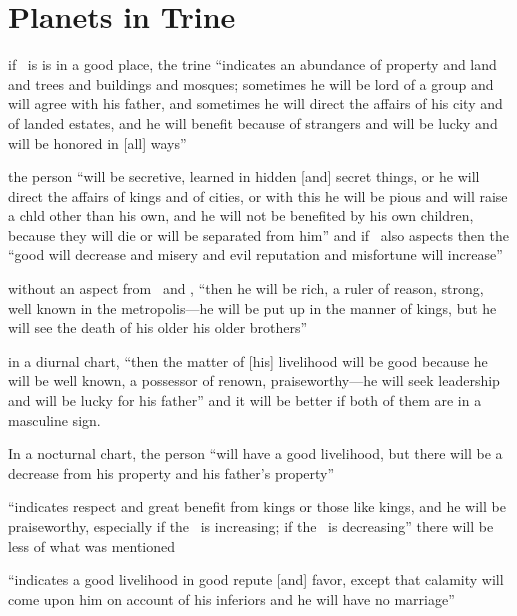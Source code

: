 \section{Planets in Trine}
\begin{description}[style=multiline,leftmargin=2.5cm]
\item[\Saturn\Trine\Jupiter] if \Jupiter\, is is in a good place, the trine  ``indicates an abundance of property and land and trees and buildings and mosques; sometimes he will be lord of a group and will agree with his father, and sometimes he will direct the affairs of his city and of landed estates, and he will benefit because of strangers and will be lucky and will be honored in [all] ways''

\item[\Saturn\Trine\Jupiter\, \& \Mercury] the person ``will be secretive, learned in hidden [and] secret things, or he will direct the affairs of kings and of cities, or with this he will be pious and will raise a chld other than his own, and he will not be benefited by his own children, because they will die or will be separated from him'' and if \Mars\, also aspects then the ``good will decrease and misery and evil reputation and misfortune will increase''

\item[\Saturn\Trine\Mars] without an aspect from \Jupiter\, and \Mercury, ``then he will be rich, a ruler of reason, strong, well known in the metropolis---he will be put up in the manner of kings, but he will see the death of his older his older brothers''

\item[\Saturn\Trine\Sun] in a diurnal chart, ``then the matter of [his] livelihood will be good because he will be well known, a possessor of renown, praiseworthy---he will seek leadership and will be lucky for his father'' and it will be better if both of them are in a masculine sign. 

In a nocturnal chart, the person ``will have a good livelihood, but there will be a decrease from his property and his father's property''

\item[\Saturn\Trine\Moon] ``indicates respect and great benefit from kings or those like kings, and he will be praiseworthy, especially if the \Moon\, is increasing; if the \Moon\, is decreasing'' there will be less of what was mentioned

\item[\Saturn\Trine\Venus] ``indicates a good livelihood in good repute [and] favor, except that calamity will come upon him on account of his inferiors and he will have no marriage''


\end{description}
